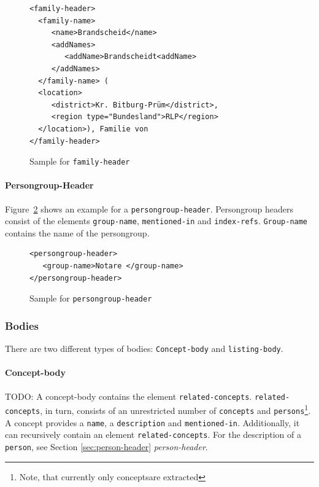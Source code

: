 \begin{figure}[H]
\centering
\begin{verbatim}
<family-header>
  <family-name>
     <name>Brandscheid</name>
     <addNames>
        <addName>Brandscheidt<addName>       
     </addNames>
  </family-name> (
  <location>
     <district>Kr. Bitburg-Prüm</district>, 
     <region type="Bundesland">RLP</region>
  </location>), Familie von 
</family-header>
\end{verbatim}
\caption{Sample for \texttt{family-header}}
\label{fig:family-header-xml}
\end{figure}

\paragraph{Persongroup-Header}
Figure~\ref{fig:persongroup-header-xml} shows an example for a \texttt{persongroup-header}. Persongroup headers consist of the elements \texttt{group-name}, \texttt{mentioned-in} and \texttt{index-refs}. \texttt{Group-name} contains the name of the persongroup.

\begin{figure}[H]
\centering
\begin{verbatim}
<persongroup-header>
   <group-name>Notare </group-name>
</persongroup-header>
\end{verbatim}
\caption{Sample for \texttt{persongroup-header}}
\label{fig:persongroup-header-xml}
\end{figure}

\subsubsection{Bodies}
There are two different types of bodies: \texttt{Concept-body} and \texttt{listing-body}.

\paragraph{Concept-body}
TODO: A concept-body contains the element \texttt{related-concepts}. \texttt{related-concepts}, in turn, consists of an unrestricted number of \texttt{concepts} and \texttt{persons}\footnote{Note, that currently only conceptsare extracted}. A concept provides a \texttt{name}, a \texttt{description} and \texttt{mentioned-in}. Additionally, it can recursively contain an element \texttt{related-concepts}. For the description of a \texttt{person}, see Section \ref{sec:person-header} \textit{person-header}.


